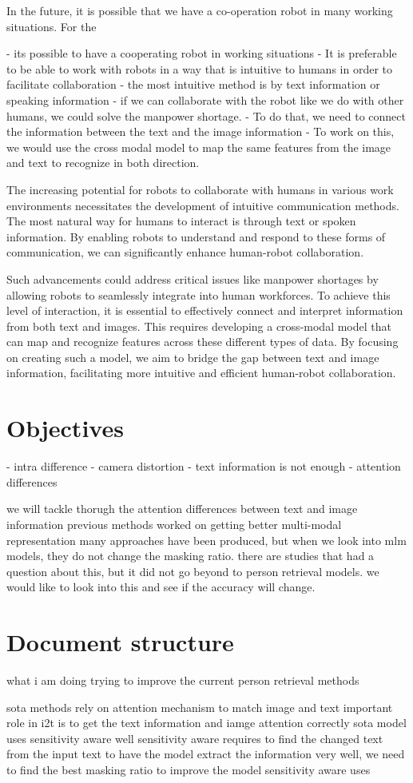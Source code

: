 In the future, it is possible that we have a co-operation robot in many working situations. For the 

- its possible to have a cooperating robot in working situations
- It is preferable to be able to work with robots in a way that is intuitive to humans in order to facilitate collaboration
- the most intuitive method is by text information or speaking information 
- if we can collaborate with the robot like we do with other humans, we could solve the manpower shortage.
- To do that, we need to connect the information between the text and the image information 
- To work on this, we would use the cross modal model to map the same features from the image and text to recognize in both direction.

The increasing potential for robots to collaborate with humans in various work environments necessitates the development of intuitive communication methods. The most natural way for humans to interact is through text or spoken information. By enabling robots to understand and respond to these forms of communication, we can significantly enhance human-robot collaboration.

Such advancements could address critical issues like manpower shortages by allowing robots to seamlessly integrate into human workforces. To achieve this level of interaction, it is essential to effectively connect and interpret information from both text and images. This requires developing a cross-modal model that can map and recognize features across these different types of data. By focusing on creating such a model, we aim to bridge the gap between text and image information, facilitating more intuitive and efficient human-robot collaboration.

\section{Objectives}
- intra difference
- camera distortion
- text information is not enough
- attention differences

we will tackle thorugh the attention differences between text and image information
previous methods worked on getting better multi-modal representation 
many approaches have been produced, but when we look into mlm models, they do not change the masking ratio. there are studies that had a question about this, but it did not go beyond to person retrieval models. we would like to look into this and see if the accuracy will change.

\section{Document structure}

what i am doing 
trying to improve the current person retrieval methods

sota methods rely on attention mechanism to match image and text 
important role in i2t is to get the text information and iamge attention correctly 
sota model uses sensitivity aware well 
sensitivity aware requires to find the changed text from the input text 
to have the model extract the information very well, we need to find the best masking ratio to improve the model
sensitivity aware uses 
